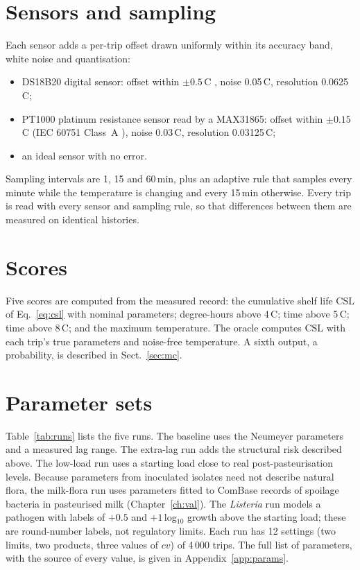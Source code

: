 \documentclass[11pt,a4paper,twoside,openany]{book}
\newcommand{\CSL}{\mathrm{CSL}}
\newcommand{\degC}{\,\textdegree C}
\newcommand{\secref}[1]{Sect.~\ref{#1}}
\theoremstyle{plain}\newtheorem{proposition}{Proposition}\newtheorem{corollary}{Corollary}
\theoremstyle{definition}\newtheorem{definition}{Definition}[chapter]
\begin{document}
\section{Sensors and sampling}
Each sensor adds a per-trip offset drawn uniformly within its accuracy band, white noise and quantisation:
\begin{itemize}
\item DS18B20 digital sensor: offset within $\pm0.5$\degC{} \cite{ds18b20}, noise 0.05\degC, resolution 0.0625\degC;
\item PT1000 platinum resistance sensor read by a MAX31865: offset within $\pm0.15$\degC{} (IEC 60751 Class~A \cite{iec60751}), noise 0.03\degC, resolution 0.03125\degC;
\item an ideal sensor with no error.
\end{itemize}
Sampling intervals are 1, 15 and 60\,min, plus an adaptive rule that samples every minute while the temperature is changing and every 15\,min otherwise. Every trip is read with every sensor and sampling rule, so that differences between them are measured on identical histories.

\section{Scores}
Five scores are computed from the measured record: the cumulative shelf life $\CSL$ of Eq.~\eqref{eq:csl} with nominal parameters; degree-hours above 4\degC; time above 5\degC; time above 8\degC; and the maximum temperature. The oracle computes $\CSL$ with each trip's true parameters and noise-free temperature. A sixth output, a probability, is described in \secref{sec:mc}.

\section{Parameter sets}
Table~\ref{tab:runs} lists the five runs. The baseline uses the Neumeyer parameters and a measured lag range. The extra-lag run adds the structural risk described above. The low-load run uses a starting load close to real post-pasteurisation levels. Because parameters from inoculated isolates need not describe natural flora, the milk-flora run uses parameters fitted to ComBase records of spoilage bacteria in pasteurised milk (Chapter~\ref{ch:val}). The \textit{Listeria} run models a pathogen with labels of $+0.5$ and $+1$\,log$_{10}$ growth above the starting load; these are round-number labels, not regulatory limits. Each run has 12 settings (two limits, two products, three values of $cv$) of 4\,000 trips. The full list of parameters, with the source of every value, is given in Appendix~\ref{app:params}.
\end{document}

